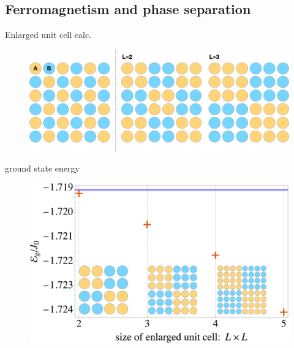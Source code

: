 \documentclass[]{beamer}
\begin{document}
\subsection{Ferromagnetism and phase separation}
\begin{frame} %
\begin{block}{Enlarged unit cell calc.}
\begin{figure}[!htb]
    \centering
    \includegraphics[width=.64\columnwidth]{figs/fig-suppl.pdf}
\end{figure}
\pause
\end{block}
\begin{block}{ground state energy}
\begin{figure}
    \centering
    \includegraphics[width=.5\columnwidth]{figs/phase_separation.pdf}
\end{figure}
\end{block}
\end{frame}
\end{document}
